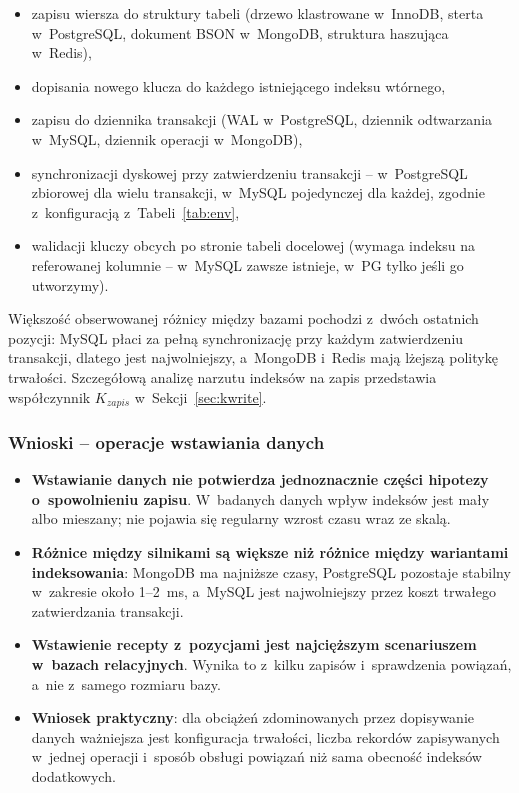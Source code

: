 \documentclass[12pt,a4paper]{article}
\begin{document}
\begin{itemize}[noitemsep]
    \item zapisu wiersza do struktury tabeli (drzewo klastrowane w~InnoDB, sterta w~PostgreSQL, dokument BSON w~MongoDB, struktura haszująca w~Redis),
    \item dopisania nowego klucza do każdego istniejącego indeksu wtórnego,
    \item zapisu do dziennika transakcji (WAL w~PostgreSQL, dziennik odtwarzania w~MySQL, dziennik operacji w~MongoDB),
    \item synchronizacji dyskowej przy zatwierdzeniu transakcji -- w~PostgreSQL zbiorowej dla wielu transakcji, w~MySQL pojedynczej dla każdej, zgodnie z~konfiguracją z~Tabeli~\ref{tab:env},
    \item walidacji kluczy obcych po stronie tabeli docelowej (wymaga indeksu na referowanej kolumnie -- w~MySQL zawsze istnieje, w~PG tylko jeśli go utworzymy).
\end{itemize}

Większość obserwowanej różnicy między bazami pochodzi z~dwóch ostatnich pozycji: MySQL płaci za pełną synchronizację przy każdym zatwierdzeniu transakcji, dlatego jest najwolniejszy, a~MongoDB i~Redis mają lżejszą politykę trwałości. Szczegółową analizę narzutu indeksów na zapis przedstawia współczynnik $K_{zapis}$ w~Sekcji~\ref{sec:kwrite}.

\subsubsection*{Wnioski -- operacje wstawiania danych}

\begin{itemize}[noitemsep]
    \item \textbf{Wstawianie danych nie potwierdza jednoznacznie części hipotezy o~spowolnieniu zapisu}. W~badanych danych wpływ indeksów jest mały albo mieszany; nie pojawia się regularny wzrost czasu wraz ze skalą.
    \item \textbf{Różnice między silnikami są większe niż różnice między wariantami indeksowania}: MongoDB ma najniższe czasy, PostgreSQL pozostaje stabilny w~zakresie około 1--2~ms, a~MySQL jest najwolniejszy przez koszt trwałego zatwierdzania transakcji.
    \item \textbf{Wstawienie recepty z~pozycjami jest najcięższym scenariuszem w~bazach relacyjnych}. Wynika to z~kilku zapisów i~sprawdzenia powiązań, a~nie z~samego rozmiaru bazy.
    \item \textbf{Wniosek praktyczny}: dla obciążeń zdominowanych przez dopisywanie danych ważniejsza jest konfiguracja trwałości, liczba rekordów zapisywanych w~jednej operacji i~sposób obsługi powiązań niż sama obecność indeksów dodatkowych.
\end{itemize}
\end{document}
